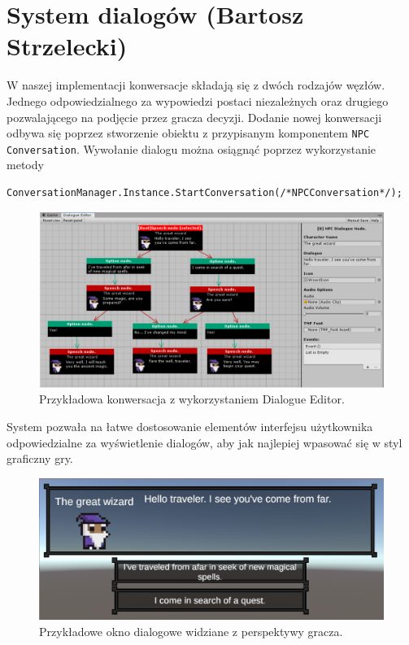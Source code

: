 \section{System dialogów (Bartosz Strzelecki)}\label{s:dia_impl}

W naszej implementacji konwersacje składają się z dwóch rodzajów węzłów. Jednego odpowiedzialnego za wypowiedzi postaci niezależnych oraz drugiego
pozwalającego na podjęcie przez gracza decyzji.
Dodanie nowej konwersacji odbywa się poprzez stworzenie obiektu z przypisanym komponentem \texttt{NPC Conversation}.
Wywołanie dialogu można osiągnąć poprzez wykorzystanie metody


\begin{verbatim}
ConversationManager.Instance.StartConversation(/*NPCConversation*/);
\end{verbatim}

\begin{figure}[h]
\centering
\includegraphics[width=1\textwidth]{images/dial}
\caption{Przykładowa konwersacja z wykorzystaniem Dialogue Editor.}
\end{figure}
System pozwała na łatwe dostosowanie elementów interfejsu użytkownika odpowiedzialne za wyświetlenie dialogów, aby jak najlepiej wpasować się
w styl graficzny gry.

\begin{figure}[h]
\centering
\includegraphics[width=1\textwidth]{images/d}
\caption{Przykładowe okno dialogowe widziane z perspektywy gracza.}
\end{figure}
